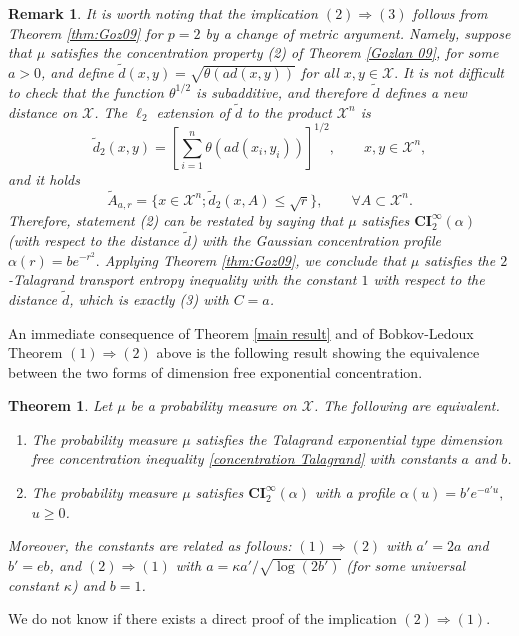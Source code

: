 \documentclass[11pt]{amsart}
\newtheorem{thm}[equation]{Theorem}
\newtheorem{rem}[equation]{Remark}
\numberwithin{equation}{section}
\begin{document}
\begin{rem}
It is worth noting that the implication $(2)\Rightarrow (3)$ follows from Theorem \ref{thm:Goz09} for $p=2$ by a change of metric argument. Namely, suppose that $\mu$ satisfies the concentration property (2) of Theorem \ref{Gozlan 09}, for some $a>0$, and define $\tilde{d}(x,y)=\sqrt{\theta(ad(x,y))}$ for all $x,y \in {\mathcal{X}}.$ It is not difficult to check that the function $\theta^{1/2}$ is subadditive, and therefore $\tilde{d}$ defines a new distance on ${\mathcal{X}}$. The $\ell_2$ extension of $\tilde{d}$ to the product ${\mathcal{X}}^n$ is
\[
\tilde{d}_2(x,y)= \left[\sum_{i=1}^n \theta(ad(x_i,y_i))\right]^{1/2},\qquad x,y\in {\mathcal{X}}^n,
\]
and it holds 
\[
\widetilde{A}_{a,r} = \{ x\in {\mathcal{X}}^n ; \tilde{d}_2(x,A) \leq \sqrt{r}\},\qquad \forall A \subset {\mathcal{X}}^n.
\]
Therefore, statement (2) can be restated by saying that $\mu$ satisfies $\mathbf{CI}_2^\infty (\alpha)$ (with respect to the distance $\tilde{d}$) with the Gaussian concentration profile $\alpha(r)=be^{-r^2}.$ Applying Theorem \ref{thm:Goz09}, we conclude that $\mu$ satisfies the $2$-Talagrand transport entropy inequality with the constant $1$ with respect to the distance $\tilde{d}$, which is exactly (3) with $C=a$.
\end{rem}

An immediate consequence of Theorem \ref{main result} and of Bobkov-Ledoux Theorem $(1)\Rightarrow (2)$ above is the following result showing the equivalence between the two forms of dimension free exponential concentration.

\begin{thm} \label{canicule}
Let $\mu$ be a probability measure on ${\mathcal{X}}$. The following are equivalent.
\begin{enumerate}
\item The probability measure $\mu$ satisfies the Talagrand exponential type dimension free concentration inequality \eqref{concentration Talagrand} with constants $a$ and $b$.
\item The probability measure $\mu$ satisfies $\mathbf{CI}_2^\infty (\alpha)$ with a profile $\alpha(u)=b'e^{-a'u},$ $u\geq0$.
\end{enumerate}
Moreover, the constants are related as follows:
$(1)\Rightarrow (2)$ with $a'=2a$ and $b'=eb$, and $(2)\Rightarrow (1)$ with $a=\kappa a'/\sqrt{\log(2b')}$ (for some universal constant $\kappa$) and $b=1$.
\end{thm}

We do not know if there exists a direct proof of the implication $(2) \Rightarrow (1)$.
\end{document}
